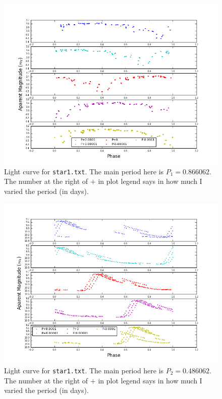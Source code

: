 \begin{enumerate} [a)]
\begin{figure}[tb]
\centering
\includegraphics[scale=0.5]{star1txt_phase_quality.png}
\caption{Light curve for \texttt{star1.txt}. The main period here is $P_1 = 0.866062$. The number at the right of $+$ in plot legend says in how much I varied the period (in days).}
\label{fig:F1}
\end{figure}

\begin{figure}[tb]
\centering
\includegraphics[scale=0.5]{star2txt_phase_quality.png}
\caption{Light curve for \texttt{star1.txt}. The main period here is $P_2 = 0.486062$. The number at the right of $+$ in plot legend says in how much I varied the period (in days).}
\label{fig:F1}
\end{figure}


\end{enumerate}
